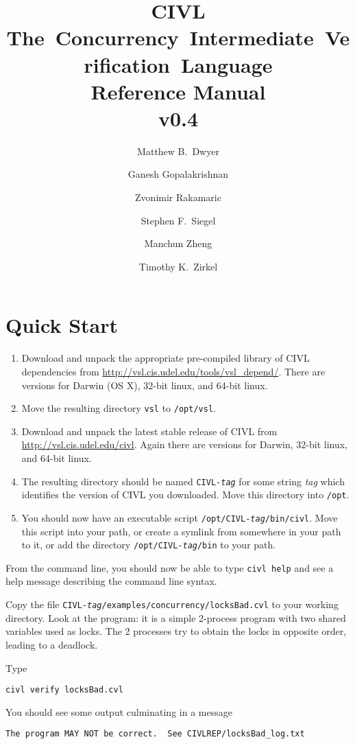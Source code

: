 \documentclass[11pt]{book}
\title{{\huge\bf CIVL}\\\mbox{The Concurrency Intermediate Verification
  Language}\\Reference Manual\\ v0.4}
\author{%
  Matthew B.\ Dwyer \and
  Ganesh Gopalakrishnan \and
  Zvonimir Rakamaric \and
  Stephen F.\ Siegel \and
  Manchun Zheng \and
  Timothy K.\ Zirkel
}
\begin{document}
\maketitle
\tableofcontents

\chapter{Quick Start}

\begin{enumerate}
\item Download and unpack the appropriate pre-compiled library of CIVL
  dependencies from \url{http://vsl.cis.udel.edu/tools/vsl_depend/}.
  There are versions for Darwin (OS X), 32-bit linux, and 64-bit
  linux.
\item Move the resulting directory \texttt{vsl} to \texttt{/opt/vsl}.
\item Download and unpack the latest stable release of CIVL from 
  \url{http://vsl.cis.udel.edu/civl}.  Again there are versions
  for Darwin, 32-bit linux, and 64-bit linux.
\item The resulting directory should be named
  \texttt{CIVL-\textit{tag}} for some string \textit{tag} which
  identifies the version of CIVL you downloaded.  Move this directory
  into \texttt{/opt}.
\item You should now have an executable script
  \texttt{/opt/CIVL-\textit{tag}/bin/civl}.  Move this script into
  your path, or create a symlink from somewhere in your path to it, or
  add the directory \texttt{/opt/CIVL-\textit{tag}/bin} to your path.
\end{enumerate}

From the command line, you should now be able to type \texttt{civl
  help} and see a help message describing the command line syntax.

Copy the file
\texttt{CIVL-\textit{tag}/examples/concurrency/locksBad.cvl} to your
working directory.  Look at the program: it is a simple 2-process
program with two shared variables used as locks.  The 2 processes try
to obtain the locks in opposite order, leading to a deadlock.

Type
\begin{verbatim}
civl verify locksBad.cvl
\end{verbatim}
You should see some output culminating in a message 
\begin{verbatim}
The program MAY NOT be correct.  See CIVLREP/locksBad_log.txt
\end{verbatim}
\end{document}
